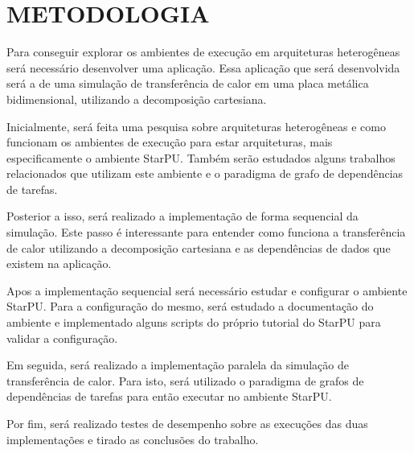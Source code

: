
\chapter{METODOLOGIA}
\label{chap:metodologia}

Para conseguir explorar os ambientes de execução em arquiteturas heterogêneas será necessário desenvolver uma aplicação.
Essa aplicação que será desenvolvida será a de uma simulação de transferência de calor em uma placa metálica bidimensional,
utilizando a decomposição cartesiana.

Inicialmente, será feita uma pesquisa sobre arquiteturas heterogêneas e como funcionam os ambientes de execução para estar arquiteturas,
mais especificamente o ambiente StarPU.
Também serão estudados alguns trabalhos relacionados que utilizam este ambiente e o paradigma de grafo de dependências de tarefas.

Posterior a isso, será realizado a implementação de forma sequencial da simulação.
Este passo é interessante para entender como funciona a transferência de calor utilizando a decomposição cartesiana e as dependências de
dados que existem na aplicação.

Apos a implementação sequencial será necessário estudar e configurar o ambiente StarPU. Para a configuração do mesmo,
será estudado a documentação do ambiente e implementado
alguns scripts do próprio tutorial do StarPU para validar a configuração.

Em seguida, será realizado a implementação paralela da simulação de transferência de calor.
Para isto, será utilizado o paradigma de grafos de dependências de tarefas para então executar no ambiente StarPU.

Por fim, será realizado testes de desempenho sobre as execuções das duas implementações e tirado as conclusões do trabalho.